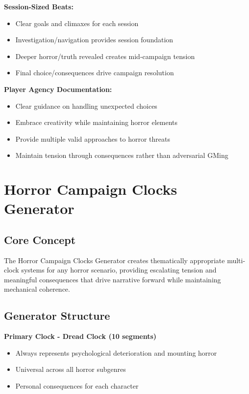 \documentclass[11pt]{article}
\begin{document}
\textbf{Session-Sized Beats:}
\begin{itemize}
\item Clear goals and climaxes for each session
\item Investigation/navigation provides session foundation
\item Deeper horror/truth revealed creates mid-campaign tension
\item Final choice/consequences drive campaign resolution
\end{itemize}

\textbf{Player Agency Documentation:}
\begin{itemize}
\item Clear guidance on handling unexpected choices
\item Embrace creativity while maintaining horror elements
\item Provide multiple valid approaches to horror threats
\item Maintain tension through consequences rather than adversarial GMing
\end{itemize}

\section{Horror Campaign Clocks Generator}

\subsection{Core Concept}

The Horror Campaign Clocks Generator creates thematically appropriate multi-clock systems for any horror scenario, providing escalating tension and meaningful consequences that drive narrative forward while maintaining mechanical coherence.

\subsection{Generator Structure}

\textbf{Primary Clock - Dread Clock (10 segments)}
\begin{itemize}
\item Always represents psychological deterioration and mounting horror
\item Universal across all horror subgenres
\item Personal consequences for each character
\end{itemize}
\end{document}
